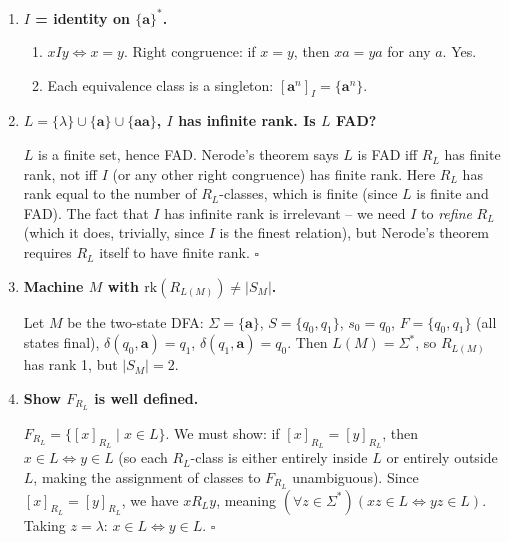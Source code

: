 \begin{enumerate}[{2.}1.]
\begin{enumerate}
These are the only two of the eight languages satisfying part (e).
\end{enumerate}

\item \textbf{$I$ = identity on $\{\mathbf{a}\}^*$.}

\begin{enumerate}
\item $x I y\Leftrightarrow x=y$. Right congruence: if $x=y$, then $xa=ya$ for any $a$. Yes.
\item Each equivalence class is a singleton: $[\mathbf{a}^n]_I=\{\mathbf{a}^n\}$.
\end{enumerate}

\item \textbf{$L=\{\lambda\}\cup\{\mathbf{a}\}\cup\{\mathbf{aa}\}$, $I$ has infinite rank. Is $L$ FAD?}

$L$ is a finite set, hence FAD. Nerode's theorem says $L$ is FAD iff $R_L$ has finite rank, not iff $I$ (or any other right congruence) has finite rank. Here $R_L$ has rank equal to the number of $R_L$-classes, which is finite (since $L$ is finite and FAD). The fact that $I$ has infinite rank is irrelevant -- we need $I$ to \emph{refine} $R_L$ (which it does, trivially, since $I$ is the finest relation), but Nerode's theorem requires $R_L$ itself to have finite rank. $\square$

\item \textbf{Machine $M$ with $\mathrm{rk}(R_{L(M)})\neq |S_M|$.}

Let $M$ be the two-state DFA: $\Sigma=\{\mathbf{a}\}$, $S=\{q_0,q_1\}$, $s_0=q_0$, $F=\{q_0,q_1\}$ (all states final), $\delta(q_0,\mathbf{a})=q_1$, $\delta(q_1,\mathbf{a})=q_0$. Then $L(M)=\Sigma^*$, so $R_{L(M)}$ has rank 1, but $|S_M|=2$.

\item \textbf{Show $F_{R_L}$ is well defined.}

$F_{R_L}=\{[x]_{R_L}\mid x\in L\}$. We must show: if $[x]_{R_L}=[y]_{R_L}$, then $x\in L\Leftrightarrow y\in L$ (so each $R_L$-class is either entirely inside $L$ or entirely outside $L$, making the assignment of classes to $F_{R_L}$ unambiguous). Since $[x]_{R_L}=[y]_{R_L}$, we have $x R_L y$, meaning $(\forall z\in\Sigma^*)(xz\in L\Leftrightarrow yz\in L)$. Taking $z=\lambda$: $x\in L\Leftrightarrow y\in L$. $\square$


\end{enumerate}
